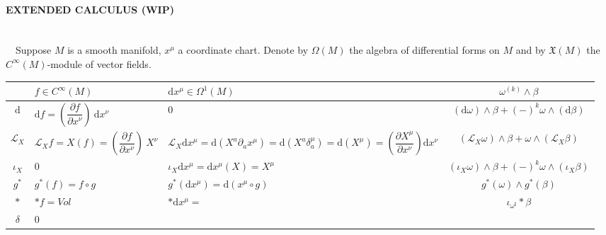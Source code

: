 \documentclass[a4paper,12pt]{scrartcl}
\renewcommand{\d}{\textrm{d}}
\providecommand{\codiff}{\delta}
\providecommand{\Lie}{\mathcal{L}}%
\begin{document}
  \begin{landscape}
    \thispagestyle{empty}
    \noindent
    \paragraph{EXTENDED CALCULUS (WIP)}
    	\mbox{}\\
        $\quad$Suppose $M$ is a smooth manifold, $x^\mu$ a coordinate chart. Denote by $\Omega(M)$ the algebra of differential forms on $M$ and by $\mathfrak{X}(M)$ the $C^\infty(M)$-module of vector fields.  \\
    \vspace{5mm}
    \begin{tabularx}{\linewidth}{|c|X|X|c|}
      \hline
     	  & $f \in C^\infty(M)$ & $\d x^\mu \in \Omega^1(M)$ & $\omega^{(k)} \wedge \beta$  \\
      \hline
      	$\d$ & $\d f = \left(\dfrac{\partial f }{\partial x^\nu} \right) \: \d x^\nu$ & 0 & $\left( \d \omega \right) \wedge \beta + (-)^k \omega \wedge \left( \d\beta \right) $ \\
      	$\Lie_X$ & $\Lie_X f = X(f) = \left(\dfrac{\partial f }{\partial x^\nu} \right) \: X^\nu$ & $\Lie_X \d x^\mu = \d \left(X^a \partial_a x^\mu\right) =  \d \left(X^a \delta_a^\mu \right) = \d\left(X^\mu\right) = \left(\dfrac{\partial X^\mu}{\partial x^\nu}\right)\d x^\nu$ & $\left( \Lie_X \omega \right) \wedge \beta + \omega \wedge \left(\Lie_X\beta \right)$ \\
      	$\iota_X$  & $0$ & $\iota_X \d x^\mu = \d x^\mu (X) = X^\mu$ & $\left( \iota_X \omega \right) \wedge \beta + (-)^k \omega \wedge \left( \iota_X\beta \right) $ \\
      	$g^\ast$  \footnotemark[4]  & $g^\ast \left(f\right) = f \circ g $ & $ g^\ast \left(\d x^\mu \right) = \d\left(x^\mu \circ g \right)$ & $g^\ast\left(\omega\right) \wedge g^\ast \left( \beta \right)$ \\ 
      	$\ast$ & $\ast f = Vol$ & $\ast \d x^\mu = $  & $ \iota_{\omega^\sharp} \ast \beta$ \\
      	$\codiff$ & $0$ &  & \\
      \hline
    \end{tabularx}
    

\end{landscape}
\end{document}
